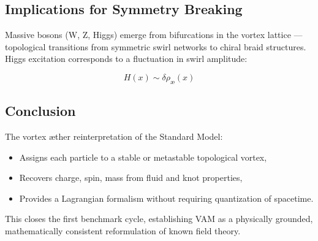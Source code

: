 \documentclass[preprint]{revtex4-2}
\begin{document}
\subsection{Implications for Symmetry Breaking}

Massive bosons (W, Z, Higgs) emerge from bifurcations in the vortex lattice — topological transitions from symmetric swirl networks to chiral braid structures. Higgs excitation corresponds to a fluctuation in swirl amplitude:

\begin{equation}
H(x) \sim \delta \rho_\text{\ae}(x)
\end{equation}

\subsection{Conclusion}

The vortex æther reinterpretation of the Standard Model:
\begin{itemize}
    \item Assigns each particle to a stable or metastable topological vortex,
    \item Recovers charge, spin, mass from fluid and knot properties,
    \item Provides a Lagrangian formalism without requiring quantization of spacetime.
\end{itemize}

This closes the first benchmark cycle, establishing VAM as a physically grounded, mathematically consistent reformulation of known field theory.
\end{document}
